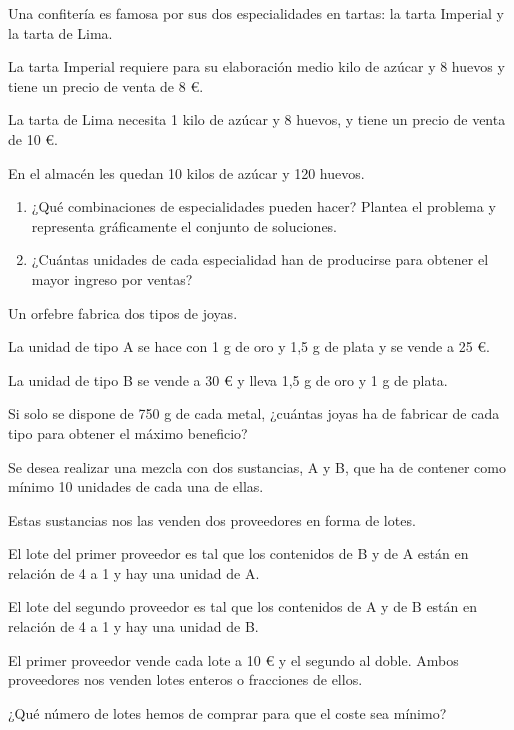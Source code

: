 \begin{Ejer}
Una confiter\'ia es famosa por sus dos especialidades en tartas: la tarta Imperial y la tarta de Lima.

La tarta Imperial requiere para su elaboraci\'on medio kilo de az\'ucar y 8 huevos y tiene un precio de venta de 8 €.

La tarta de Lima necesita 1 kilo de az\'ucar y 8 huevos, y tiene un precio de venta de 10 €.

En el almac\'en les quedan 10 kilos de az\'ucar y 120 huevos.

\begin{enumerate}
\item ¿Qu\'e combinaciones de especialidades pueden hacer? Plantea el problema y representa gr\'aficamente el conjunto de soluciones.
\item ¿Cu\'antas unidades de cada especialidad han de producirse para obtener el mayor ingreso por ventas?
\end{enumerate}
\end{Ejer}

\begin{Ejer}
Un orfebre fabrica dos tipos de joyas.

La unidad de tipo A se hace con 1 g de oro y 1,5 g de plata y se vende a 25 €.

La unidad de tipo B se vende a 30 € y lleva 1,5 g de oro y 1 g de plata.

Si solo se dispone de 750 g de cada metal, ¿cu\'antas joyas ha de fabricar de cada tipo para obtener el m\'aximo beneficio?
\end{Ejer}


\begin{Ejer}
Se desea realizar una mezcla con dos sustancias, A y B, que ha de contener como m\'inimo 10 unidades de cada una de ellas.

Estas sustancias nos las venden dos proveedores en forma de lotes.

El lote del primer proveedor es tal que los contenidos de B y de A est\'an en relaci\'on de 4 a 1 y hay una unidad de A.

El lote del segundo proveedor es tal que los contenidos de A y de B est\'an en relaci\'on de 4 a 1 y hay una unidad de B.

El primer proveedor vende cada lote a 10 € y el segundo al doble. Ambos proveedores nos venden lotes enteros o fracciones de ellos.

¿Qu\'e n\'umero de lotes hemos de comprar para que el coste sea m\'inimo?
\end{Ejer}

